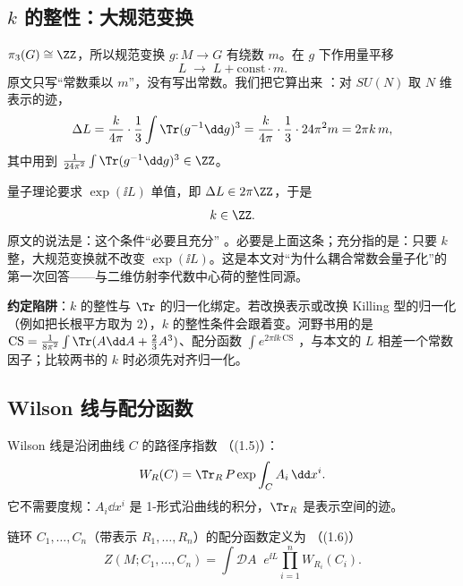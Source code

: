 \subsection{$k$ 的整性：大规范变换}

$\pi_3(G)\cong\ZZ$，所以规范变换 $g:M\to G$ 有绕数 $m$。在 $g$ 下作用量平移 
\begin{equation}
L\;\longrightarrow\; L+\text{const}\cdot m .
\end{equation}
原文只写“常数乘以 $m$”，没有写出常数。我们把它算出来 \ours：对 $SU(N)$ 取 $N$ 维表示的迹，
\begin{equation}
\Delta L=\frac{k}{4\pi}\cdot\frac13\int \Tr(g^{-1}\dd g)^3
=\frac{k}{4\pi}\cdot\frac13\cdot 24\pi^2 m=2\pi k\,m ,
\label{eq:bigauge}
\end{equation}
其中用到 $\frac1{24\pi^2}\int\Tr(g^{-1}\dd g)^3\in\ZZ$。

量子理论要求 $\exp(\ii L)$ 单值，即 $\Delta L\in 2\pi\ZZ$，于是
\begin{equation}
k\in\ZZ .
\end{equation}
原文的说法是：这个条件“必要且充分” 。必要是上面这条；充分指的是：只要 $k$ 整，大规范变换就不改变 $\exp(\ii L)$。这是本文对“为什么耦合常数会量子化”的第一次回答——与二维仿射李代数中心荷的整性同源。

\begin{keypoint}
\textbf{约定陷阱}：$k$ 的整性与 $\Tr$ 的归一化绑定。若改换表示或改换 Killing 型的归一化（例如把长根平方取为 2），$k$ 的整性条件会跟着变。河野书用的是 $\mathrm{CS}=\frac1{8\pi^2}\int\Tr(A\dd A+\frac23A^3)$、配分函数 $\int e^{2\pi\ii k\,\mathrm{CS}}$ ，与本文的 $L$ 相差一个常数因子；比较两书的 $k$ 时必须先对齐归一化。
\end{keypoint}

\subsection{Wilson 线与配分函数}

Wilson 线是沿闭曲线 $C$ 的路径序指数 （(1.5)）：
\begin{equation}
W_R(C)=\Tr_R\,P\exp\int_C A_i\,\dd x^i .
\label{eq:wilson}
\end{equation}
它不需要度规：$A_i\dd x^i$ 是 1-形式沿曲线的积分，$\Tr_R$ 是表示空间的迹。

链环 $C_1,\dots,C_n$（带表示 $R_1,\dots,R_n$）的配分函数定义为 （(1.6)）
\begin{equation}
Z(M;C_1,\dots,C_n)=\int \mathcal{D}A\;\; e^{\ii L}\prod_{i=1}^n W_{R_i}(C_i).
\label{eq:partition}
\end{equation}

